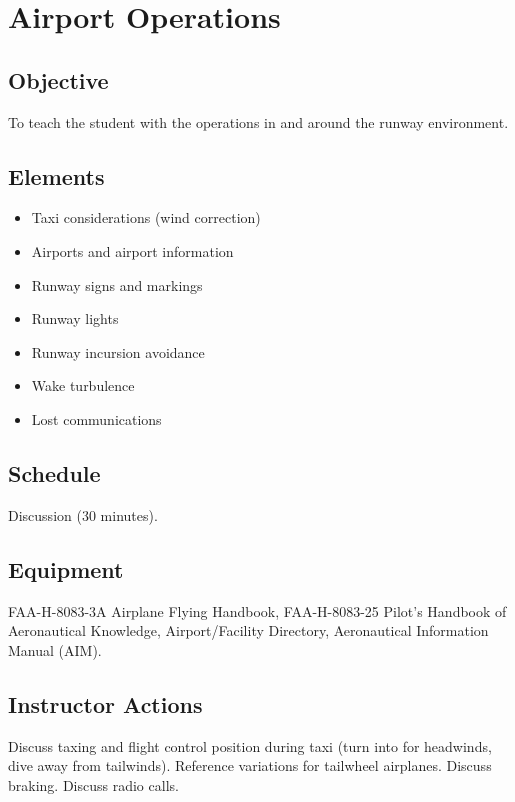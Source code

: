 
\chapter{Airport Operations}

\section{Objective}

To teach the student with the operations in and around the runway environment.

\section{Elements}

\begin{itemize}
  \item Taxi considerations (wind correction)
  \item Airports and airport information
  \item Runway signs and markings
  \item Runway lights
  \item Runway incursion avoidance
  \item Wake turbulence
  \item Lost communications
\end{itemize}

\section{Schedule}

Discussion (30 minutes).

\section{Equipment}

FAA-H-8083-3A Airplane Flying Handbook, FAA-H-8083-25 Pilot's Handbook of
Aeronautical Knowledge, Airport/Facility Directory, Aeronautical Information
Manual (AIM).

\section{Instructor Actions}

Discuss taxing and flight control position during taxi (turn into for
headwinds, dive away from tailwinds). Reference variations for tailwheel
airplanes. Discuss braking. Discuss radio calls.

